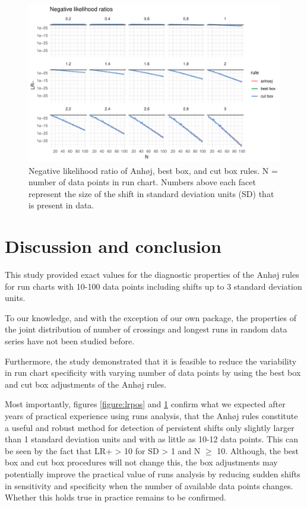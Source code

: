 \begin{figure}[htbp]
  \centering
  \includegraphics[width=\textwidth]{fig_lrneg.pdf}
  \caption{Negative likelihood ratio of Anhøj, best box, and cut box rules.
           N = number of data points in run chart.
           Numbers above each facet represent the size of the shift in standard
           deviation units (SD) that is present in data.}
  \label{figure:lrneg}
\end{figure}

\hypertarget{discussion-and-conclusion}{%
\section{Discussion and conclusion}\label{discussion-and-conclusion}}

This study provided exact values for the diagnostic properties of the
Anhøj rules for run charts with 10-100 data points including shifts up
to 3 standard deviation units.

To our knowledge, and with the exception of our own 
package, the properties of the joint distribution of number of crossings
and longest runs in random data series have not been studied before.

Furthermore, the study demonstrated that it is feasible to reduce the
variability in run chart specificity with varying number of data points
by using the best box and cut box adjustments of the Anhøj rules.

Most importantly, figures \ref{figure:lrpos} and \ref{figure:lrneg}
confirm what we expected after years of practical experience using runs
analysis, that the Anhøj rules constitute a useful and robust method for
detection of persistent shifts only slightly larger than 1 standard
deviation units and with as little as 10-12 data points. This can be
seen by the fact that LR+ \textgreater{} 10 for SD \textgreater{} 1 and
N \(\geq\) 10. Although, the best box and cut box procedures will not
change this, the box adjustments may potentially improve the practical
value of runs analysis by reducing sudden shifts in sensitivity and
specificity when the number of available data points changes. Whether
this holds true in practice remains to be confirmed.

